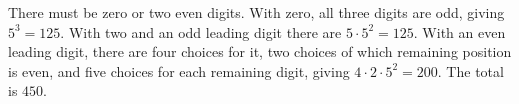 There must be zero or two even digits. With zero, all three digits are odd, giving $5^3=125$. With two and an odd leading digit there are $5\cdot5^2=125$. With an even leading digit, there are four choices for it, two choices of which remaining position is even, and five choices for each remaining digit, giving $4\cdot2\cdot5^2=200$. The total is $\boxed{450}$.
